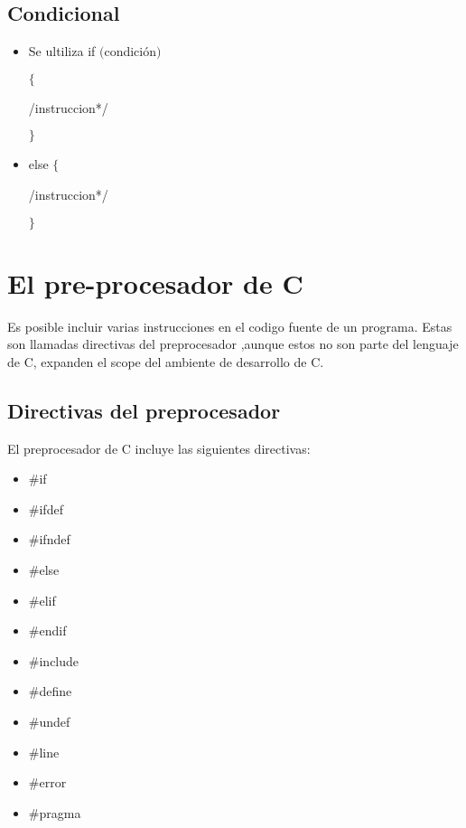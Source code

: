 \documentclass[]{article}
\begin{document}
	\subsection{Condicional}
	
	\begin{itemize}
		\item Se ultiliza if $($condición$)$ 
		
		$\lbrace$
		
		\slash*instruccion*\slash
		
		$\rbrace$
		
		\item else		$\lbrace$
		
		\slash*instruccion*\slash
		
		$\rbrace$ 
	\end{itemize}
	
	\section{El pre-procesador de C}
	
	Es posible incluir varias instrucciones en el codigo fuente de  un programa. Estas son llamadas directivas del preprocesador ,aunque estos no son parte del lenguaje de C, expanden el scope del ambiente de desarrollo de C.
	
		\subsection{Directivas del preprocesador}
		
		El preprocesador de C incluye las siguientes directivas:
		
		\begin{itemize}
			\item \#if
			\item \#ifdef
			\item \#ifndef
			\item \#else
			\item \#elif
			\item \#endif
			\item \#include
			\item \#define
			\item \#undef
			\item \#line
			\item \#error
			\item \#pragma\\
		\end{itemize}
	
\end{document}
